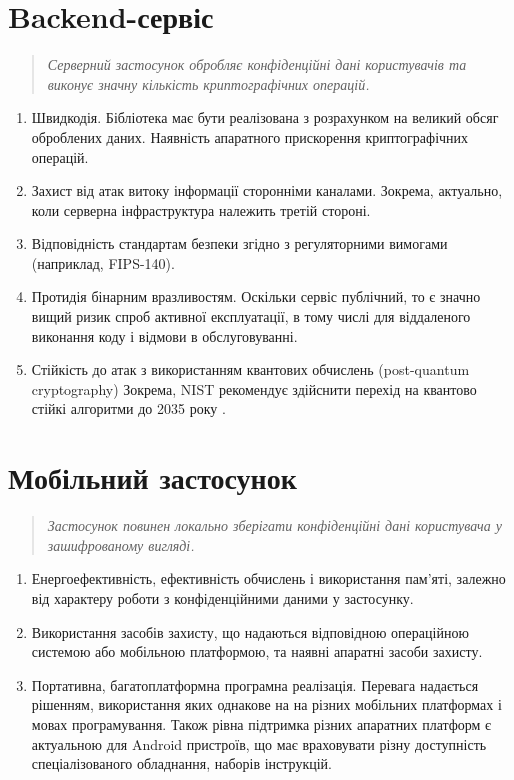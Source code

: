\documentclass{kpi-lab}
\begin{document}
\section{Backend-сервіс}\label{backend-service}
\begin{quote}\small\it
  Серверний застосунок обробляє конфіденційні дані
  користувачів та виконує значну кількість криптографічних операцій.
\end{quote}

\begin{enumerate}
  \item Швидкодія.
    Бібліотека має бути реалізована з
    розрахунком на великий обсяг оброблених даних.
    Наявність апаратного прискорення криптографічних операцій.
  \item Захист від атак витоку інформації сторонніми каналами.
    Зокрема, актуально, коли серверна інфраструктура
    належить третій стороні.
  \item Відповідність стандартам безпеки згідно з
    регуляторними вимогами (наприклад, FIPS-140).
  \item Протидія бінарним вразливостям.
    Оскільки сервіс публічний, то є значно вищий ризик спроб
    активної експлуатації, в тому числі для віддаленого
    виконання коду і відмови в обслуговуванні.
  \item Стійкість до атак з використанням квантових
    обчислень (post-quantum cryptography)
    Зокрема, NIST рекомендує здійснити перехід
    на квантово стійкі алгоритми до 2035 року
    \cite{Regenscheid2024}.
\end{enumerate}

\section{Мобільний застосунок}\label{mobile-app}
\begin{quote}\small\it
  Застосунок повинен локально зберігати конфіденційні дані
  користувача у зашифрованому вигляді.
\end{quote}
\begin{enumerate}
  \item Енергоефективність, ефективність обчислень і
    використання пам'яті,
    залежно від характеру роботи з конфіденційними даними у
    застосунку.
  \item Використання засобів захисту, що надаються
    відповідною операційною системою або мобільною платформою,
    та наявні апаратні засоби захисту.
  \item Портативна, багатоплатформна програмна реалізація.
    Перевага надається рішенням, використання яких однакове на
    на різних мобільних платформах і мовах програмування.
    Також рівна підтримка різних апаратних платформ є
    актуальною для Android пристроїв, що має враховувати
    різну доступність спеціалізованого обладнання,
    наборів інструкцій.
\end{enumerate}
\end{document}
